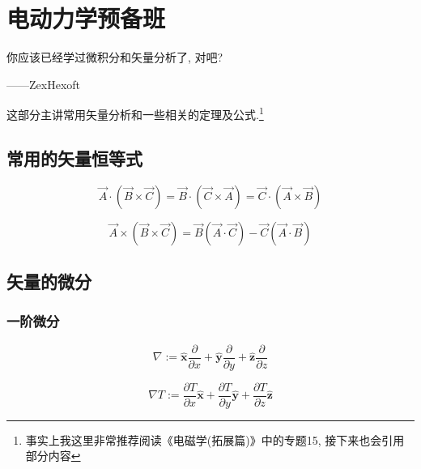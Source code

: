 \chapter{电动力学预备班}
\epigraph{你应该已经学过微积分和矢量分析了, 对吧?}{——ZexHexoft}
这部分主讲常用矢量分析和一些相关的定理及公式.\footnote{事实上我这里非常推荐阅读《电磁学(拓展篇)》中的专题15, 接下来也会引用部分内容}

\section{常用的矢量恒等式}

\begin{theorem}[标量三重积]
    \begin{equation}
        \vec A\cdot(\vec B\times\vec C)=\vec B\cdot(\vec C\times\vec A)=\vec C\cdot(\vec A\times\vec B)
    \end{equation}
\end{theorem}

\begin{theorem} \label{BAC-CAB}
        \begin{equation}
            \vec A\times(\vec B\times\vec C)=\vec B(\vec A\cdot\vec C)-\vec C(\vec A\cdot\vec B)
        \end{equation}
\end{theorem}

\section{矢量的微分}

\subsection{一阶微分}

\begin{definition}[$\nabla$算子]
    \begin{equation}
        \nabla := \hat{\mathbf{x}}\frac{\partial}{\partial x}+\hat{\mathbf{y}}\frac{\partial}{\partial y}+\hat{\mathbf{z}}\frac{\partial}{\partial z}
    \end{equation}
\end{definition}

\begin{theorem}[梯度]
    \begin{equation}
        \nabla T := \frac{\partial T}{\partial x}\hat{\mathbf{x}}+\frac{\partial T}{\partial y}\hat{\mathbf{y}}+\frac{\partial T}{\partial z}\hat{\mathbf{z}}
    \end{equation}
\end{theorem}

